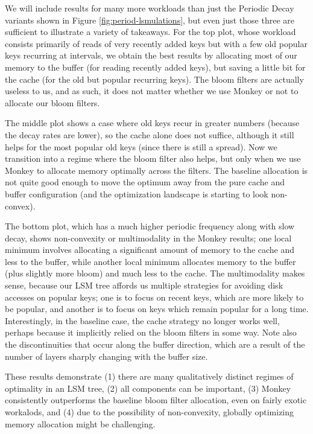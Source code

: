 \documentclass{sig-alternate-05-2015}
\begin{document}
We will include results for many more workloads than just the Periodic Decay
variants shown in Figure \ref{fig:period-lsmulations}, but even just those
three are sufficient to illustrate a variety of takeaways. For the top plot,
whose workload consists primarily of reads of very recently added keys but with a few
old popular keys recurring at intervals, we obtain the best results by allocating
most of our memory to the buffer (for reading recently added keys), but saving a little
bit for the cache (for the old but popular recurring keys). The bloom filters are
actually useless to us, and as such, it does not matter whether we use Monkey or not
to allocate our bloom filters.

The middle plot shows a case where old keys recur in greater numbers (because
the decay rates are lower), so the cache alone does not suffice, although it
still helps for the most popular old keys (since there is still a spread). Now
we transition into a regime where the bloom filter also helps, but only when we
use Monkey to allocate memory optimally across the filters. The baseline
allocation is not quite good enough to move the optimum away from the pure
cache and buffer configuration (and the optimization landscape is starting to
look non-convex).

The bottom plot, which has a much higher periodic frequency along with slow
decay, shows non-convexity or multimodality in the Monkey results; one local
minimum involves allocating a significant amount of memory to the cache and
less to the buffer, while another local minimum allocates memory to the buffer
(plus slightly more bloom) and much less to the cache. The multimodality makes
sense, because our LSM tree affords us multiple strategies for avoiding disk
accesses on popular keys; one is to focus on recent keys, which are more likely
to be popular, and another is to focus on keys which remain popular for a long
time. Interestingly, in the baseline case, the cache strategy no longer works
well, perhaps because it implicitly relied on the bloom filters in some way.
Note also the discontinuities that occur along the buffer direction, which are
a result of the number of layers sharply changing with the buffer size.

These results demonstrate (1) there are many qualitatively distinct regimes of
optimality in an LSM tree, (2) all components can be important, (3) Monkey
consistently outperforms the baseline bloom filter allocation, even on fairly
exotic workalods, and (4) due to the possibility of non-convexity, globally
optimizing memory allocation might be challenging.
\end{document}
